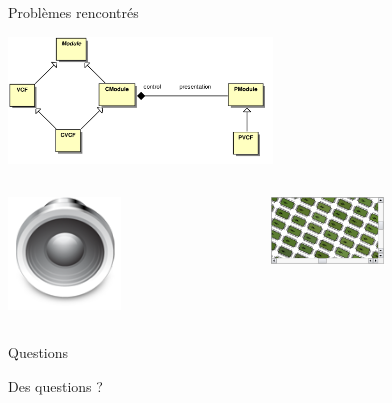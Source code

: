 \documentclass[frenchb]{beamer}
\begin{document}
\begin{frame}{Problèmes rencontrés}
    \begin{center}
        \includegraphics[width=7cm]{../img/ps/pacmodule-psm.pdf}
    \end{center}
    \pause
    \begin{columns}
        \begin{column}[l]{7cm}
        \includegraphics[width=3cm]{../img/png/arts128x128.png}
        \end{column}
        \pause
        \begin{column}[r]{4cm}
        \includegraphics[width=3cm]{../img/png/graphicsview-view.png}
        \end{column}
    \end{columns}
\end{frame}

\begin{frame}{Questions}
    \begin{center}
        Des questions ?
    \end{center}
\end{frame}
\end{document}
